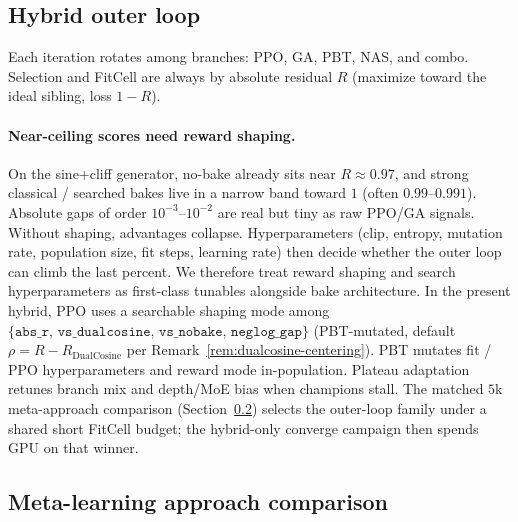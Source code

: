 \subsection{Hybrid outer loop}
\label{sec:hybrid}

Each iteration rotates among branches: PPO, GA, PBT, NAS, and combo.
Selection and FitCell are always by absolute residual $R$ (maximize toward the ideal sibling, loss $1-R$).

\paragraph{Near-ceiling scores need reward shaping.}
\label{sec:reward-shaping}
On the sine{+}cliff generator, no-bake already sits near $R\approx 0.97$, and strong classical / searched bakes live in a narrow band toward $1$ (often $0.99$--$0.991$).
Absolute gaps of order $10^{-3}$--$10^{-2}$ are real but tiny as raw PPO/GA signals.
Without shaping, advantages collapse.
Hyperparameters (clip, entropy, mutation rate, population size, fit steps, learning rate) then decide whether the outer loop can climb the last percent.
We therefore treat reward shaping and search hyperparameters as first-class tunables alongside bake architecture.
In the present hybrid, PPO uses a searchable shaping mode among $\{\texttt{abs\_r},\,\texttt{vs\_dualcosine},\,\texttt{vs\_nobake},\,\texttt{neglog\_gap}\}$ (PBT-mutated, default $\rho = R - R_{\mathrm{DualCosine}}$ per Remark~\ref{rem:dualcosine-centering}).
PBT mutates fit / PPO hyperparameters and reward mode in-population. Plateau adaptation retunes branch mix and depth/MoE bias when champions stall.
The matched $5$k meta-approach comparison (Section~\ref{sec:meta-compare}) selects the outer-loop family under a shared short FitCell budget; the hybrid-only converge campaign then spends GPU on that winner.

\subsection{Meta-learning approach comparison}
\label{sec:meta-compare}

